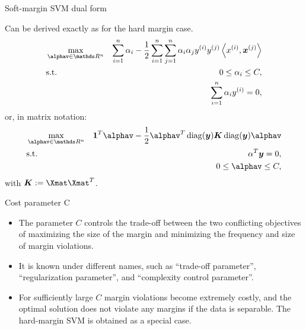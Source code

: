 \begin{vbframe}{Soft-margin SVM dual form}

Can be derived exactly as for the hard margin case.
\begin{eqnarray*}
    & \max\limits_{\alphav \in \R^n} & \sum_{i=1}^n \alpha_i - \frac{1}{2}\sum_{i=1}^n\sum_{j=1}^n\alpha_i\alpha_j\yi y^{(j)} \scp{\xi}{\xv^{(j)}} \\
    & \text{s.t. } & 0 \le \alpha_i \le C, \\
    & \quad & \sum_{i=1}^n \alpha_i \yi = 0,
\end{eqnarray*}
or, in matrix notation:
\begin{eqnarray*}
  & \max\limits_{\alphav \in \R^n} &  \one^T \alphav - \frac{1}{2} \alphav^T \diag(\yv) \bm{K} \diag(\yv) \alphav \\
  & \text{s.t.} & \alpha^T \yv = 0, \\
  &  & 0 \leq \alphav \leq C,
\end{eqnarray*}
with $\bm{K}:=\Xmat \Xmat^T$.
\end{vbframe}

\begin{vbframe}{Cost parameter C}

  \begin{itemize}
    \item The parameter $C$ controls the trade-off between the two conflicting
    objectives of maximizing the size of the margin and minimizing the frequency and size of margin
    violations.
    \item It is known under different names, such as \enquote{trade-off parameter}, \enquote{regularization parameter},
    and \enquote{complexity control parameter}.
    \item   For sufficiently large $C$ margin violations become extremely costly,
  and the optimal solution does not violate any margins if the
  data is separable. The hard-margin SVM is obtained as a special case.
  \end{itemize}
\end{vbframe}


